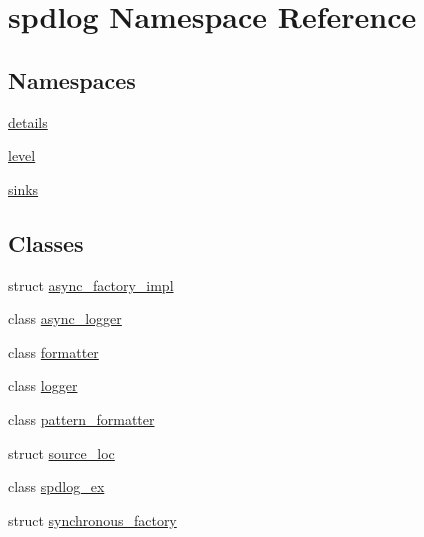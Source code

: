 \hypertarget{namespacespdlog}{}\section{spdlog Namespace Reference}
\label{namespacespdlog}
\subsection*{Namespaces}
\begin{DoxyCompactItemize}
\item 
 \hyperlink{namespacespdlog_1_1details}{details}
\item 
 \hyperlink{namespacespdlog_1_1level}{level}
\item 
 \hyperlink{namespacespdlog_1_1sinks}{sinks}
\end{DoxyCompactItemize}
\subsection*{Classes}
\begin{DoxyCompactItemize}
\item 
struct \hyperlink{structspdlog_1_1async__factory__impl}{async\+\_\+factory\+\_\+impl}
\item 
class \hyperlink{classspdlog_1_1async__logger}{async\+\_\+logger}
\item 
class \hyperlink{classspdlog_1_1formatter}{formatter}
\item 
class \hyperlink{classspdlog_1_1logger}{logger}
\item 
class \hyperlink{classspdlog_1_1pattern__formatter}{pattern\+\_\+formatter}
\item 
struct \hyperlink{structspdlog_1_1source__loc}{source\+\_\+loc}
\item 
class \hyperlink{classspdlog_1_1spdlog__ex}{spdlog\+\_\+ex}
\item 
struct \hyperlink{structspdlog_1_1synchronous__factory}{synchronous\+\_\+factory}
\end{DoxyCompactItemize}
